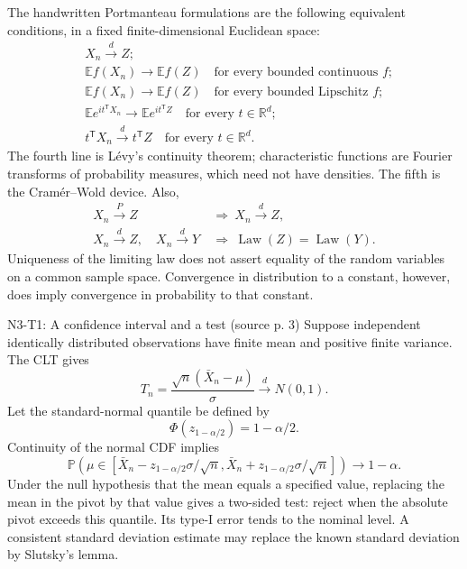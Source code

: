 \documentclass[12pt]{article}
\newcommand{\E}{\mathbb E}
\newcommand{\Prob}{\mathbb P}
\newcommand{\R}{\mathbb R}
\DeclareMathOperator{\Law}{Law}
\begin{document}
The handwritten Portmanteau formulations are the following equivalent
conditions, in a fixed finite-dimensional Euclidean space:
\begin{align}
 &X_n\xrightarrow{d}Z;\\
 &\E f(X_n)\longrightarrow\E f(Z)
 \quad\text{for every bounded continuous }f;\\
 &\E f(X_n)\longrightarrow\E f(Z)
 \quad\text{for every bounded Lipschitz }f;\\
 &\E e^{it^{\mathsf T}X_n}\longrightarrow\E e^{it^{\mathsf T}Z}
 \quad\text{for every }t\in\R^d;\\
 &t^{\mathsf T}X_n\xrightarrow{d}t^{\mathsf T}Z
 \quad\text{for every }t\in\R^d.
\end{align}
The fourth line is L\'evy's continuity theorem; characteristic functions are
Fourier transforms of probability measures, which need not have densities.
The fifth is the Cram\'er--Wold device. Also,
\begin{align}
 X_n\xrightarrow{P}Z&\ \Longrightarrow\ X_n\xrightarrow{d}Z,\\
 X_n\xrightarrow{d}Z,\quad X_n\xrightarrow{d}Y
 &\ \Longrightarrow\ \Law(Z)=\Law(Y).
\end{align}
Uniqueness of the limiting law does not assert equality of the random
variables on a common sample space. Convergence in distribution to a
constant, however, does imply convergence in probability to that constant.

\begin{todobox}{N3-T1: A confidence interval and a test (source p. 3)}
Suppose independent identically distributed observations have finite mean
and positive finite variance. The CLT gives
\begin{equation}
 T_n=\frac{\sqrt n(\bar X_n-\mu)}{\sigma}\xrightarrow{d}N(0,1).
\end{equation}
Let the standard-normal quantile be defined by
\begin{equation}
 \Phi(z_{1-\alpha/2})=1-\alpha/2.
\end{equation}
Continuity of the normal CDF implies
\begin{equation}
 \Prob\!\left(\mu\in
 [\bar X_n-z_{1-\alpha/2}\sigma/\sqrt n,
  \bar X_n+z_{1-\alpha/2}\sigma/\sqrt n]\right)\longrightarrow1-\alpha.
\end{equation}
Under the null hypothesis that the mean equals a specified value, replacing
the mean in the pivot by that value gives a two-sided test: reject when the
absolute pivot exceeds this quantile. Its type-I error tends to the nominal
level. A consistent standard deviation estimate may replace the known
standard deviation by Slutsky's lemma.
\end{todobox}
\end{document}
